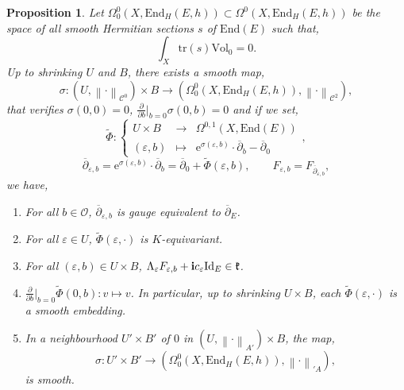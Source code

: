 \documentclass{article}
\newtheorem{proposition}[theorem]{Proposition}
\theoremstyle{remark}
\theoremstyle{definition}
\newcommand{\End}{\mathrm{End}}
\newcommand{\tr}{\mathrm{tr}}
\newcommand{\Vol}{\mathrm{Vol}}
\newcommand{\Id}{\mathrm{Id}}
\renewcommand{\i}{\boldsymbol{\mathrm{i}}}
\newcommand{\e}{\boldsymbol{\mathrm{e}}}
\newcommand{\norme}[1]{\left\| #1 \right\|}
\newcommand{\dbar}{\overline{\partial}}
\newcommand{\mC}{\mathcal{C}}
\newcommand{\fonction}[4]{\left\{ \begin{array}{rcl}
		\displaystyle #1 & \longrightarrow & \displaystyle #2\\
		\displaystyle #3 & \longmapsto & \displaystyle #4
	\end{array} \right.}
\begin{document}
\begin{proposition}\label{PRO:Tranche déformée}
    Let $\Omega_0^0(X,\End_H(E,h)) \subset \Omega^0(X,\End_H(E,h))$ be the space of all smooth Hermitian sections $s$ of $\End(E)$ such that,
    $$
    \int_X \tr(s)\Vol_0 = 0.
    $$
    Up to shrinking $U$ and $B$, there exists a smooth map,
    $$
    \sigma : (U,\norme{\cdot}_{\mC^0}) \times B \rightarrow (\Omega^0_0(X,\End_H(E,h)),\norme{\cdot}_{\mC^2}),
    $$
    that verifies $\sigma(0,0) = 0$, $\frac{\partial}{\partial b}|_{b = 0}\sigma(0,b) = 0$ and if we set,
    $$
    \tilde{\Phi} : \fonction{U \times B}{\Omega^{0,1}(X,\End(E))}{(\varepsilon,b)}{\e^{\sigma(\varepsilon,b)} \cdot \dbar_b - \dbar_0},
    $$
    $$
    \dbar_{\varepsilon,b} = \e^{\sigma(\varepsilon,b)} \cdot \dbar_b = \dbar_0 + \tilde{\Phi}(\varepsilon,b), \qquad F_{\varepsilon,b} = F_{\dbar_{\varepsilon,b}},
    $$
    we have,
    \begin{enumerate}
        \item For all $b \in \mathcal{O}$, $\dbar_{\varepsilon,b}$ is gauge equivalent to $\dbar_E$.
        \item For all $\varepsilon \in U$, $\tilde{\Phi}(\varepsilon,\cdot)$ is $K$-equivariant.
        \item For all $(\varepsilon,b) \in U \times B$, $\Lambda_\varepsilon F_{\varepsilon,b} + \i c_\varepsilon\Id_E \in \frak{k}$.
        \item $\frac{\partial}{\partial b}|_{b = 0}\tilde{\Phi}(0,b) : v \mapsto v$. In particular, up to shrinking $U \times B$, each $\tilde{\Phi}(\varepsilon,\cdot)$ is a smooth embedding.
        \item In a neighbourhood $U' \times B'$ of $0$ in $(U,\norme{\cdot}_{A'}) \times B$, the map,
        $$
        \sigma : U' \times B' \rightarrow (\Omega_0^0(X,\End_H(E,h)),\norme{\cdot}_{'\!A}),
        $$
        is smooth.
    \end{enumerate}
\end{proposition}
\end{document}
